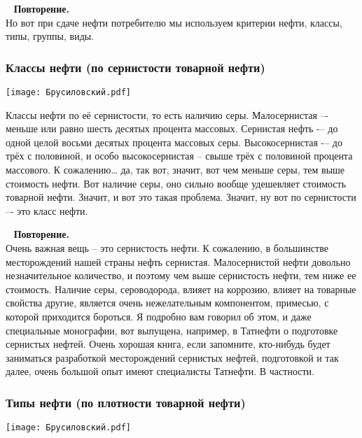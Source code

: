 \documentclass[main.tex]{subfiles}
\begin{document}
\ \newline
\textbf{Повторение.}\\
Но вот при сдаче нефти потребителю мы используем критерии нефти, классы, типы, группы, виды.

\subsubsection{Классы нефти (по сернистости товарной нефти)}

\begin{center}
\texttt{[image: Брусиловский.pdf]}
\end{center}

Классы нефти по её сернистости, то есть наличию серы.
Малосернистая –- меньше или равно шесть десятых процента массовых.
Сернистая нефть -– до одной целой восьми десятых процента массовых серы.
Высокосернистая -– до трёх с половиной, и особо высокосернистая – свыше трёх с половиной процента массового.
К сожалению… да, так вот, значит, вот чем меньше серы, тем выше стоимость нефти.
Вот наличие серы, оно сильно вообще удешевляет стоимость товарной нефти.
Значит, и вот это такая проблема.
Значит, ну вот по сернистости –- это класс нефти.

\ \newline
\textbf{Повторение.}\\
Очень важная вещь -- это сернистость нефти.
К сожалению, в большинстве месторождений нашей страны нефть сернистая.
Малосернистой нефти довольно незначительное количество, и поэтому чем выше сернистость нефти, тем ниже ее стоимость.
Наличие серы, сероводорода, влияет на коррозию, влияет на товарные свойства другие, является очень нежелательным компонентом, примесью, с которой приходится бороться.
Я подробно вам говорил об этом, и даже специальные монографии, вот выпущена, например, в Татнефти о подготовке сернистых нефтей.
Очень хорошая книга, если запомните, кто-нибудь будет заниматься разработкой месторождений сернистых нефтей, подготовкой и так далее, очень большой опыт имеют специалисты Татнефти. В частности.

\subsubsection{Типы нефти (по плотности товарной нефти)}

\begin{center}
\texttt{[image: Брусиловский.pdf]}
\end{center}
\end{document}

